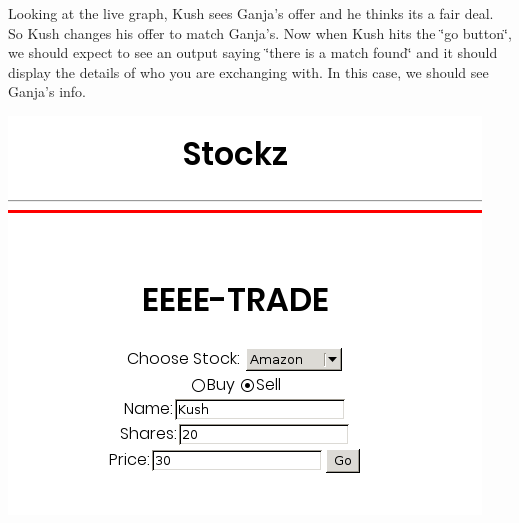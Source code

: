 Looking at the live graph, Kush sees Ganja's offer and he thinks its a fair deal. So Kush changes his offer to match Ganja's. Now when Kush hits the \char`\"{}go button\char`\"{}, we should expect to see an output saying \char`\"{}there is a match found\char`\"{} and it should display the details of who you are exchanging with. In this case, we should see Ganja's info.

 
\includegraphics[scale=0.5]{../test6.png}
 